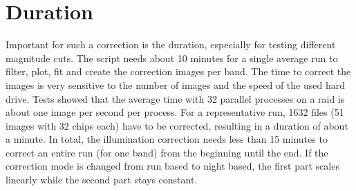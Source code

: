 \section{Duration}
\label{sec:IllumCorrectionDuration}
Important for such a correction is the duration, especially for testing different magnitude cuts. The script needs about 10 minutes for a single average run to filter, plot, fit and create the correction images per band. The time to correct the images is very sensitive to the number of images and the speed of the used hard drive. Tests showed that the average time with 32 parallel processes on a raid is about one image per second per process. For a representative run, 1632 files (51 images with 32 chips each) have to be corrected, resulting in a duration of about a minute. In total, the illumination correction needs less than 15 minutes to correct an entire run (for one band) from the beginning until the end. If the correction mode is changed from run based to night based, the first part scales linearly while the second part stays constant.
